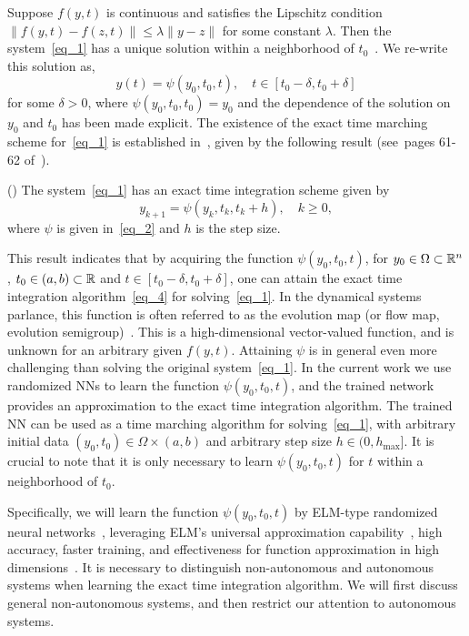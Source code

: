 Suppose $f(y,t)$ is continuous and satisfies the Lipschitz condition
$\|f(y,t)-f(z,t) \|\leqslant \lambda \|y-z \|$ for some constant $\lambda$.
Then the system~\eqref{eq_1} has a unique solution within a neighborhood
of $t_0$~\cite{HairerNW1993}. We re-write this solution as,
\begin{equation}\label{eq_2}
  y(t) = \psi(y_0,t_0,t), \quad t\in[t_0-\delta, t_0+\delta]
\end{equation}
for some $\delta>0$, where
$  %
  \psi(y_0,t_0,t_0) = y_0
$  %
and the dependence of the solution on $y_0$ and $t_0$ has been made explicit.
The existence of the exact time marching scheme for~\eqref{eq_1}
is established in~\cite{StuartH1996,Mickens2021}, given by the following result
(see~pages 61-62 of~\cite{Mickens2021}).
\begin{theorem}(\cite{Mickens2021})\label{thm_1}
  The system~\eqref{eq_1} has an exact time integration scheme given by
  \begin{equation}\label{eq_4}
    y_{k+1} = \psi(y_k,t_k,t_k+h), \quad k\geqslant 0,
  \end{equation}
  where $\psi$ is given in~\eqref{eq_2} and $h$ is the step size.
\end{theorem}

This result indicates that by acquiring the function
$\psi(y_0,t_0,t)$, for $y_0\in\Omega\subset\mathbb{R}^n$,
$t_0\in(a,b)\subset\mathbb{R}$ and $t\in[t_0-\delta,t_0+\delta]$,
one can attain the exact time integration algorithm~\eqref{eq_4}
for solving~\eqref{eq_1}.
In the dynamical systems parlance, this function is often referred to
as the evolution map (or flow map, evolution semigroup)~\cite{StuartH1996}.
This is a high-dimensional vector-valued function, and
is unknown for an arbitrary given
$f(y,t)$. Attaining $\psi$ is in general even more challenging than
solving the original system~\eqref{eq_1}.
In the current work we use randomized NNs
to learn the function $\psi(y_0,t_0,t)$, and the trained network
provides an approximation to the exact time integration algorithm.
The trained NN can be used as
a time marching algorithm for solving~\eqref{eq_1},
with arbitrary initial data $(y_0,t_0)\in\Omega\times(a,b)$ and arbitrary
step size $h\in(0,h_{\max}]$.
It is crucial to note that it is only necessary to learn
$\psi(y_0,t_0,t)$ for $t$ within a neighborhood of $t_0$.

Specifically, we will learn the function $\psi(y_0,t_0,t)$
by ELM-type randomized neural networks~\cite{DongL2021,DongY2022rm,NiD2023,WangD2024},
leveraging ELM's universal approximation capability~\cite{IgelnikP1995,HuangCS2006},
high accuracy, faster training,
and effectiveness for function approximation in high
dimensions~\cite{DongL2021,WangD2024}.
It is necessary to distinguish non-autonomous and autonomous systems
when learning the exact time integration algorithm.
We will first discuss %
general non-autonomous systems, and then restrict our attention
to autonomous systems.



